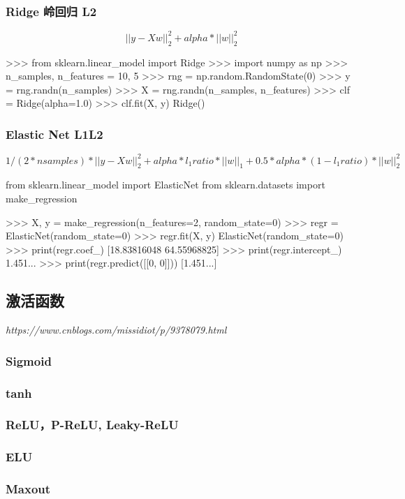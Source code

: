 \documentclass{scrartcl}
\numberwithin{equation}{section}   %
\begin{document}
\subsubsection{Ridge 岭回归 L2}
$$||y - Xw||^2_2 + alpha * ||w||^2_2$$
\begin{python}
>>> from sklearn.linear_model import Ridge
>>> import numpy as np
>>> n_samples, n_features = 10, 5
>>> rng = np.random.RandomState(0)
>>> y = rng.randn(n_samples)
>>> X = rng.randn(n_samples, n_features)
>>> clf = Ridge(alpha=1.0)
>>> clf.fit(X, y)
Ridge()
\end{python}
\subsubsection{Elastic Net L1L2}
$$ 1 / (2 * nsamples) * ||y - Xw||^2_2
+ alpha * l_1ratio * ||w||_1
+ 0.5 * alpha * (1 - l_1ratio) * ||w||^2_2$$
\begin{python}
    from sklearn.linear_model import ElasticNet
    from sklearn.datasets import make_regression

    >>> X, y = make_regression(n_features=2, random_state=0)
    >>> regr = ElasticNet(random_state=0)
    >>> regr.fit(X, y)
    ElasticNet(random_state=0)
    >>> print(regr.coef_)
    [18.83816048 64.55968825]
    >>> print(regr.intercept_)
    1.451...
    >>> print(regr.predict([[0, 0]]))
    [1.451...]
\end{python}




\subsection{激活函数}
\textsl{https://www.cnblogs.com/missidiot/p/9378079.html}
\subsubsection{Sigmoid}
\subsubsection{tanh}
\subsubsection{ReLU，P-ReLU, Leaky-ReLU}
\subsubsection{ELU}
\subsubsection{Maxout}
\end{document}
